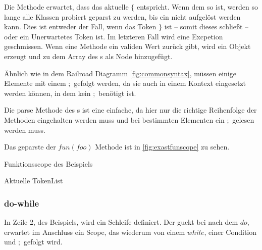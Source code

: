 {      Die  Methode erwartet, dass das aktuelle  \myRIn$\{$ entspricht. Wenn dem so ist, werden so lange alle  Klassen probiert geparst zu werden, bis ein  nicht aufgelöst werden kann. Dies ist entweder der Fall, wenn das Token \myRIn$\}$ ist -- somit dieses  schließt -- oder ein Unerwartetes Token ist. Im letzteren Fall wird eine Excpetion geschmissen. Wenn eine Methode ein validen Wert zurück gibt, wird ein Objekt erzeugt und zu dem Array des s als Node hinzugefügt.

      Ähnlich wie in dem Railroad Diagramm \autoref{fig:commonsyntax}, müssen einige  Elemente mit einem \myRIn$;$ gefolgt werden, da sie auch in einem Kontext eingesetzt werden können, in dem kein \myRIn$;$ benötigt ist.

      Die parse Methode des s ist eine einfache, da hier nur die richtige Reihenfolge der Methoden eingehalten werden muss und bei bestimmten  Elementen ein \myRIn$;$ gelesen werden muss.

      Das geparste  der \myMIn$fun(foo)$ Methode ist in \autoref{fig:exastfunscope} zu sehen.

      \begin{paracol}{2}
        \begin{myCodeEnv}
          \centering
          \begin{myInvBox}[width=.9\linewidth]
            
          \end{myInvBox}
          \caption{Funktionsscope des Beispiels}
          \label{fig:exastfunscope}
        \end{myCodeEnv}
        \switchcolumn
        \begin{myCodeEnv}
          \centering
          \begin{myInvBox}[width=.9\linewidth]
            
          \caption*{Aktuelle TokenList}
          \end{myInvBox}
        \end{myCodeEnv}
      \end{paracol}

    \subsubsection{do-while}
    \label{sssec:do-while}
      In Zeile 2, des Beispiels, wird ein  Schleife definiert. Der  guckt bei  nach dem \myRIn$do$, erwartet im Anschluss ein Scope, das wiederum von einem \myRIn$while$, einer Condition und \myRIn$;$ gefolgt wird.

}
